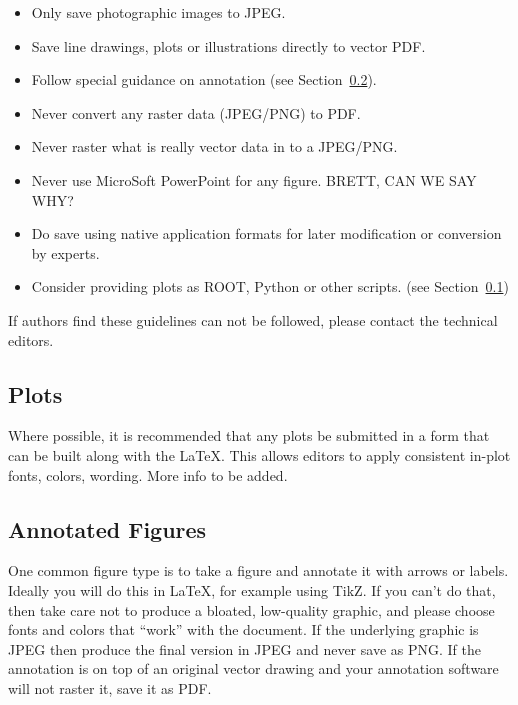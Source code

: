 \begin{itemize}
\item Only save photographic images to JPEG.
\item Save line drawings, plots or illustrations directly to vector PDF.
\item Follow special guidance on annotation (see Section~\ref{sec:annotate}).
\item Never convert any raster data (JPEG/PNG) to PDF.
\item Never raster what is really vector data in to a JPEG/PNG.
\item Never use MicroSoft PowerPoint for any figure.   BRETT, CAN WE SAY WHY?
\item Do save using native application formats for later modification or conversion by experts.
\item Consider providing plots as ROOT, Python or other scripts.  (see Section~\ref{sec:plots})
\end{itemize}

\noindent If authors find these guidelines can not be followed, please contact the technical editors.   

\subsection{Plots}
\label{sec:plots}

Where possible, it is recommended that any plots be submitted in a form that can be built along with the \LaTeX.  This allows editors to apply consistent in-plot fonts, colors, wording.  More info to be added.

\subsection{Annotated Figures}
\label{sec:annotate}

One common figure type is to take a figure and annotate it with arrows or labels.  Ideally you will do this in 
LaTeX, for example using TikZ.  If you can't do that, then take care not to produce a bloated, low-quality graphic, and please choose fonts and colors that ``work'' with the document.  If the underlying graphic is JPEG then produce the final version in JPEG and never save as PNG.  If the annotation is on top of an original vector drawing and your annotation software will not raster it, save it as PDF.


